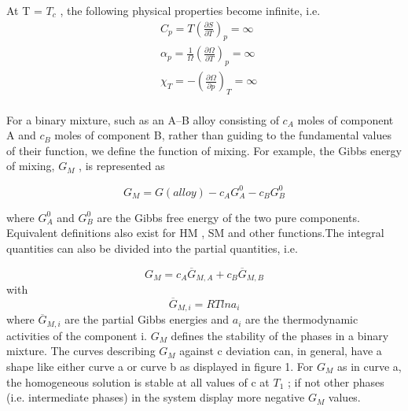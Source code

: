 \documentclass[12pt]{article}
\newcommand*{\1}{\hspace{1pt}}
\begin{document}
    At T = $T_c$ , the following physical properties become infinite, i.e.\\


    \begin{align}
    & C_p = T \left(\frac{\partial S}{\partial T} \right) _p = \infty \\
    & \alpha _p = \frac{1}{\Omega} \left(\frac{\partial \Omega}{\partial T} \right) _p = \infty \\
    & \chi _T = -\left(\frac{\partial \Omega}{\partial p} \right) _T = \infty 
    \end{align}\\

    For a binary mixture, such as an A–B alloy consisting of $c_A$ moles of component A and $c_B$
    moles of component B, rather than guiding to the fundamental values of their function, 
    we define the function of mixing. For example, the Gibbs energy of mixing, $G_M$ , is represented as

    \begin{equation}
        G_M = G(alloy) - c_A G^{0}_{A} - c_B G^{0}_{B}
    \end{equation}

where $G ^{0}_{A}$ and $G ^{0}_{B}$ are the Gibbs free energy of the two pure components. Equivalent
definitions also exist for HM , SM and other functions.The integral quantities can also be divided 
into the partial quantities, i.e.

    \begin{equation}
        G_M = c_A \overline{G} _{M,A} + c_B \overline{G} _{M,B}
    \end{equation}
with
    \begin{equation}
        \overline{G} _{M,i} = RT ln a_i                \tag*{( i= A,B )}
    \end{equation}
where  $\overline{G} _{M,i} $ are the partial Gibbs energies and $a _{i}$ are the thermodynamic 
activities of the component i.
$G _M$ defines the stability of the phases in a binary mixture. The curves describing
$G _M$ against c deviation can, in general, have a shape like either curve a or curve b as displayed
in figure 1. For $G _M$ as in curve a, the homogeneous solution is stable at all values of c at
$T _1$ ; if not other phases (i.e. intermediate phases) in the system display more negative $G _M$
values.
\end{document}

